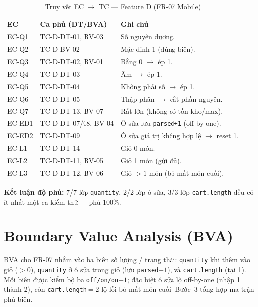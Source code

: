 \documentclass[12pt, a4paper]{report}
\begin{document}
\begin{table}[H]
    \centering
    \caption{Truy vết EC $\to$ TC — Feature D (FR-07 Mobile)}
    \begin{tabularx}{\linewidth}{C{1.8cm} C{3.4cm} X}
        \toprule
        \textbf{EC} & \textbf{Ca phủ (DT/BVA)} & \textbf{Ghi chú} \\
        \midrule
        EC-Q1 & TC-D-DT-01, BV-03 & Số nguyên dương. \\
        EC-Q2 & TC-D-BV-02 & Mặc định 1 (đúng biên). \\
        EC-Q3 & TC-D-DT-02, BV-01 & Bằng 0 $\to$ ép 1. \\
        EC-Q4 & TC-D-DT-03 & Âm $\to$ ép 1. \\
        EC-Q5 & TC-D-DT-04 & Không phải số $\to$ ép 1. \\
        EC-Q6 & TC-D-DT-05 & Thập phân $\to$ cắt phần nguyên. \\
        EC-Q7 & TC-D-DT-13, BV-07 & Rất lớn (không có tồn kho/max). \\
        EC-ED1 & TC-D-DT-07/08, BV-04 & Ô sửa lưu \texttt{parsed+1} (off-by-one). \\
        EC-ED2 & TC-D-DT-09 & Ô sửa giá trị không hợp lệ $\to$ reset 1. \\
        EC-L1 & TC-D-DT-14 & Giỏ 0 món. \\
        EC-L2 & TC-D-DT-11, BV-05 & Giỏ 1 món (gửi đủ). \\
        EC-L3 & TC-D-DT-12, BV-06 & Giỏ $>1$ món (bỏ mất món cuối). \\
        \bottomrule
    \end{tabularx}
\end{table}
\noindent\textbf{Kết luận độ phủ:} 7/7 lớp \texttt{quantity}, 2/2 lớp ô sửa, 3/3 lớp
\texttt{cart.length} đều có ít nhất một ca kiểm thử --- phủ 100\%.

\section{Boundary Value Analysis (BVA)}

BVA cho FR-07 nhắm vào ba biên số lượng / trạng thái: \texttt{quantity} khi thêm vào giỏ
($>0$), \texttt{quantity} ở ô sửa trong giỏ (lưu \texttt{parsed$+1$}), và
\texttt{cart.length} (tại 1). Mỗi biên được kiểm bộ ba \texttt{off/on/on$+1$}; đặc biệt ô sửa lộ
off-by-one (nhập 1 thành 2), còn \texttt{cart.length}$=2$ lộ lỗi bỏ mất món cuối. Bước~3 tổng hợp
ma trận phủ biên.
\end{document}

